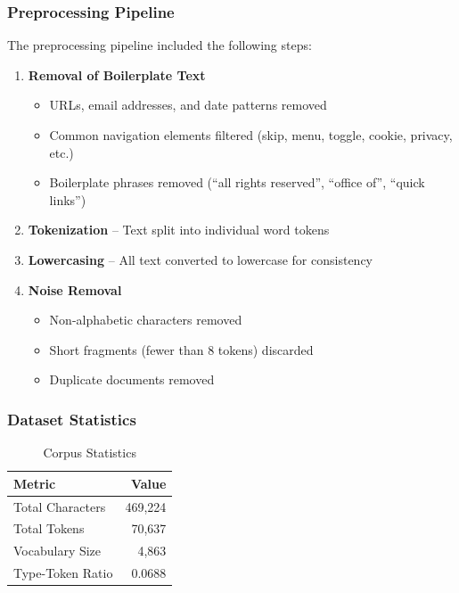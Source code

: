 \documentclass[12pt,a4paper]{article}
\begin{document}
\subsubsection{Preprocessing Pipeline}

The preprocessing pipeline included the following steps:

\begin{enumerate}
    \item \textbf{Removal of Boilerplate Text}
    \begin{itemize}
        \item URLs, email addresses, and date patterns removed
        \item Common navigation elements filtered (skip, menu, toggle, cookie, privacy, etc.)
        \item Boilerplate phrases removed (``all rights reserved'', ``office of'', ``quick links'')
    \end{itemize}

    \item \textbf{Tokenization} -- Text split into individual word tokens

    \item \textbf{Lowercasing} -- All text converted to lowercase for consistency

    \item \textbf{Noise Removal}
    \begin{itemize}
        \item Non-alphabetic characters removed
        \item Short fragments (fewer than 8 tokens) discarded
        \item Duplicate documents removed
    \end{itemize}
\end{enumerate}

\subsubsection{Dataset Statistics}

\begin{table}[H]
\centering
\caption{Corpus Statistics}
\begin{tabular}{@{}lr@{}}
\toprule
\textbf{Metric} & \textbf{Value} \\
\midrule
Total Characters & 469,224 \\
Total Tokens & 70,637 \\
Vocabulary Size & 4,863 \\
Type-Token Ratio & 0.0688 \\
\bottomrule
\end{tabular}
\end{table}
\end{document}
